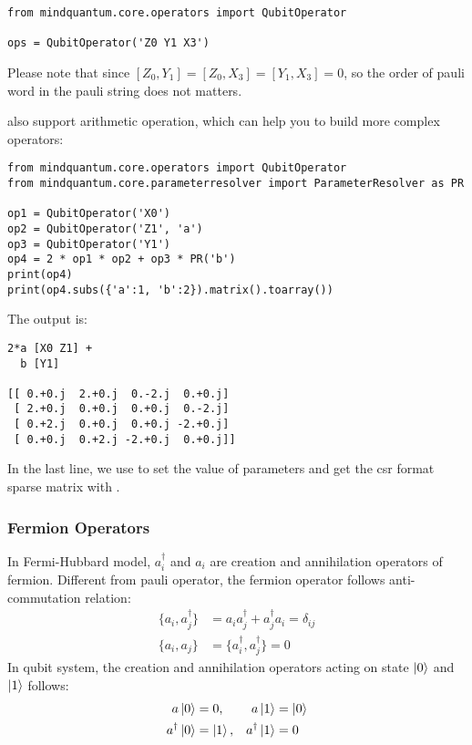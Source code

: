 \begin{lstlisting}
from mindquantum.core.operators import QubitOperator

ops = QubitOperator('Z0 Y1 X3')
\end{lstlisting}
Please note that since $[Z_0, Y_1]= [Z_0,X_3] = [Y_1, X_3]=0$, so the order of pauli word in the pauli string does not matters.

\QubitOperator also support arithmetic operation, which can help you to build more complex operators:

\begin{lstlisting}
from mindquantum.core.operators import QubitOperator
from mindquantum.core.parameterresolver import ParameterResolver as PR

op1 = QubitOperator('X0')
op2 = QubitOperator('Z1', 'a')
op3 = QubitOperator('Y1')
op4 = 2 * op1 * op2 + op3 * PR('b')
print(op4)
print(op4.subs({'a':1, 'b':2}).matrix().toarray())
\end{lstlisting}
The output is:
\begin{lstlisting}
2*a [X0 Z1] +
  b [Y1]

[[ 0.+0.j  2.+0.j  0.-2.j  0.+0.j]
 [ 2.+0.j  0.+0.j  0.+0.j  0.-2.j]
 [ 0.+2.j  0.+0.j  0.+0.j -2.+0.j]
 [ 0.+0.j  0.+2.j -2.+0.j  0.+0.j]]
\end{lstlisting}
In the last line, we use  to set the value of parameters and get the csr format sparse matrix with .

\subsubsection{Fermion Operators}

In Fermi-Hubbard model, $a_i^\dagger$ and $a_i$ are creation and annihilation operators of fermion. Different from pauli operator, the fermion operator follows anti-commutation relation:
\begin{align*}
    \{a_i, a_j^\dagger\} & = a_ia_j^\dagger + a_j^\dagger a_i = \delta_{ij} \\
    \{a_i, a_j\}         & = \{a_i^\dagger, a_j^\dagger\}=0
\end{align*}
In qubit system, the creation and annihilation operators acting on state $\ket{0}$ and $\ket{1}$ follows:
\begin{align*}
    a\ket{0}          & =0,        & a\ket{1}          & =\ket{0} \\
    a^\dagger \ket{0} & = \ket{1}, & a^\dagger \ket{1} & =0
\end{align*}


